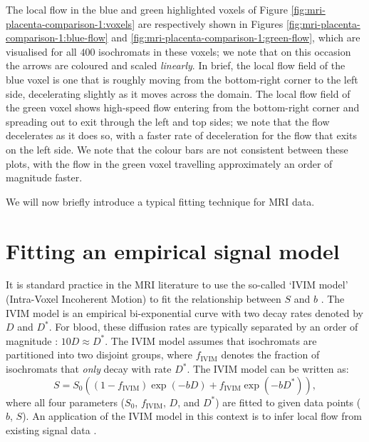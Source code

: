         The local flow in the blue and green highlighted voxels of Figure \ref{fig:mri-placenta-comparison-1:voxels} are respectively shown in Figures \ref{fig:mri-placenta-comparison-1:blue-flow} and \ref{fig:mri-placenta-comparison-1:green-flow}, which are visualised for all $400$ isochromats in these voxels; we note that on this occasion the arrows are coloured and scaled \textit{linearly}. In brief, the local flow field of the blue voxel is one that is roughly moving from the bottom-right corner to the left side, decelerating slightly as it moves across the domain. The local flow field of the green voxel shows high-speed flow entering from the bottom-right corner and spreading out to exit through the left and top sides; we note that the flow decelerates as it does so, with a faster rate of deceleration for the flow that exits on the left side. We note that the colour bars are not consistent between these plots, with the flow in the green voxel travelling approximately an order of magnitude faster.

        We will now briefly introduce a typical fitting technique for MRI data.
    
    \section{Fitting an empirical signal model} \label{sec:numerical-mri:fitting}   
        It is standard practice in the MRI literature to use the so-called `IVIM model' (Intra-Voxel Incoherent Motion) to fit the relationship between $S$ and $b$ \cite{lebihanWhatCanWe2019,dellschaftHaemodynamicsHumanPlacenta2020}. The IVIM model is an empirical bi-exponential curve with two decay rates denoted by $D$ and $D^*$. For blood, these diffusion rates are typically separated by an order of magnitude \cite{lebihanWhatCanWe2019}: $10 D \approx  D^*$. The IVIM model assumes that isochromats are partitioned into two disjoint groups, where $f_\text{IVIM}$ denotes the fraction of isochromats that \textit{only} decay with rate $D^*$. The IVIM model can be written as:
        \begin{equation}
            S = S_0((1-f_\text{IVIM})\exp(-bD) + f_\text{IVIM} \exp(-b D^*)),
            \label{eq:mri-ivim-model}
        \end{equation}
        where all four parameters ($S_0$, $f_\text{IVIM}$, $D$, and $D^*$) are fitted to given data points ($b$, $S$). An application of the IVIM model in this context is to infer local flow from existing signal data \cite{lebihanWhatCanWe2019}.

